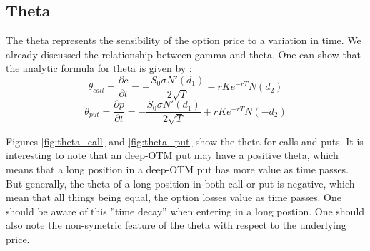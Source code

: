 \documentclass[hidelinks]{article}
\begin{document}
    \newpage
    \subsection{Theta}
    
    The theta represents the sensibility of the option price to a variation in time. We already discussed the relationship between gamma and theta. One can show that the analytic formula for theta is given by :
    $$\theta_{call} = \frac{\partial c}{\partial t} = -\frac{S_0 \sigma N'(d_1)}{2\sqrt{T}} - rKe^{-rT}N(d_2)$$
    $$\theta_{put} = \frac{\partial p}{\partial t} = -\frac{S_0 \sigma N'(d_1)}{2\sqrt{T}} + rKe^{-rT}N(-d_2)$$
    
    Figures \ref{fig:theta_call} and \ref{fig:theta_put} show the theta for calls and puts. It is interesting to note that an deep-OTM put may have a positive theta, which means that a long position in a deep-OTM put has more value as time passes. But generally, the theta of a long position in both call or put is negative, which mean that all things being equal, the option losses value as time passes. One should be aware of this ''time decay'' when entering in a long postion. One should also note the non-symetric feature of the theta with respect to the underlying price.
    
\end{document}
